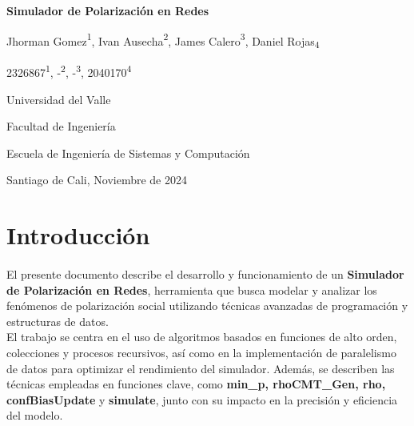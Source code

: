 \documentclass{article}
\begin{document}
  \begin{titlepage}
    \centering
    \vspace*{2cm}
    
    \Huge
    \textbf{Simulador de Polarización en Redes}
    
    \vspace{1.5cm}
    
    \Large
    Jhorman Gomez{\textsuperscript{1}}, Ivan Ausecha{\textsuperscript{2}}, James Calero{\textsuperscript{3}}, Daniel Rojas{\textsubscript{4}}
    
    \vspace{0.5cm}
    
    \large
    2326867{\textsuperscript{1}}, -{\textsuperscript{2}}, -{\textsuperscript{3}}, 2040170{\textsuperscript{4}}
    
    \vspace{0.5cm}
    
    \Large
    Universidad del Valle
    
    \vspace{0.5cm}
    
    \large
    Facultad de Ingeniería
    
    \vspace{0.5cm}
    
    \large
    Escuela de Ingeniería de Sistemas y Computación
    
    \vspace{0.5cm}
    
    \large
    Santiago de Cali, Noviembre de 2024
    
  \end{titlepage}
\section{Introducción}

\paragraph{}
El presente documento describe el desarrollo y funcionamiento de un \textbf{Simulador de Polarización en Redes}, herramienta que busca modelar y analizar los fenómenos de polarización social utilizando técnicas avanzadas de programación y estructuras de datos. 
\\

El trabajo se centra en el uso de algoritmos basados en funciones de alto orden, colecciones y procesos recursivos, así como en la implementación de paralelismo de datos para optimizar el rendimiento del simulador. Además, se describen las técnicas empleadas en funciones clave, como \textbf{min\_p, rhoCMT\_Gen, rho, confBiasUpdate} y \textbf{simulate}, junto con su impacto en la precisión y eficiencia del modelo.
\\
\end{document}
